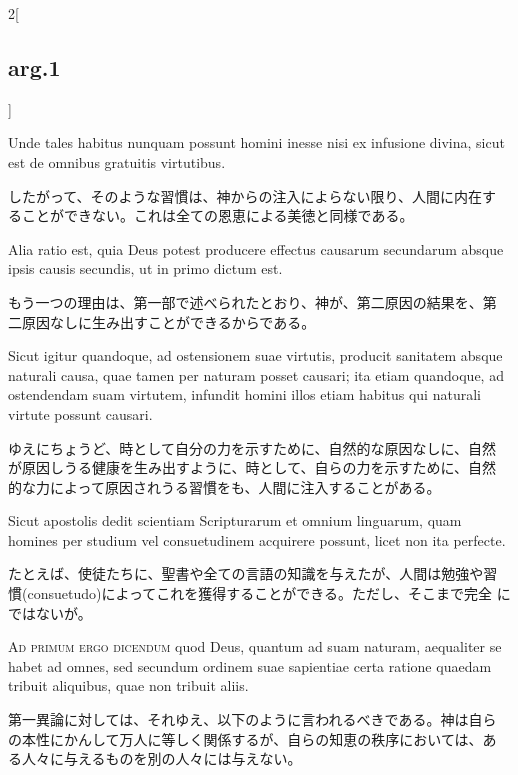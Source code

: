 \documentclass[paper=a4paper,fontsize=10pt,jafontsize=9pt,titlepage]{jlreq}
\begin{document}
\begin{paracol}{2}[\subsection{arg.1}]
\switchcolumn*

Unde tales habitus nunquam possunt homini inesse nisi ex infusione
divina, sicut est de omnibus gratuitis virtutibus.

\switchcolumn

したがって、そのような習慣は、神からの注入によらない限り、人間に内在す
ることができない。これは全ての恩恵による美徳と同様である。

\switchcolumn*

Alia ratio est, quia Deus potest producere effectus causarum
secundarum absque ipsis causis secundis, ut in primo dictum est.

\switchcolumn

もう一つの理由は、第一部で述べられたとおり、神が、第二原因の結果を、第
二原因なしに生み出すことができるからである。

\switchcolumn*

Sicut igitur quandoque, ad ostensionem suae virtutis, producit
sanitatem absque naturali causa, quae tamen per naturam posset
causari; ita etiam quandoque, ad ostendendam suam virtutem, infundit
homini illos etiam habitus qui naturali virtute possunt causari.

\switchcolumn

ゆえにちょうど、時として自分の力を示すために、自然的な原因なしに、自然
が原因しうる健康を生み出すように、時として、自らの力を示すために、自然
的な力によって原因されうる習慣をも、人間に注入することがある。

\switchcolumn*

Sicut apostolis dedit scientiam Scripturarum et omnium linguarum, quam
homines per studium vel consuetudinem acquirere possunt, licet non ita
perfecte.

\switchcolumn

たとえば、使徒たちに、聖書や全ての言語の知識を与えたが、人間は勉強や習
慣(consuetudo)によってこれを獲得することができる。ただし、そこまで完全
にではないが。

\switchcolumn*[\subsection{ad.1}]

{\scshape Ad primum ergo dicendum} quod Deus, quantum ad suam naturam,
aequaliter se habet ad omnes, sed secundum ordinem suae sapientiae
certa ratione quaedam tribuit aliquibus, quae non tribuit aliis.

\switchcolumn

第一異論に対しては、それゆえ、以下のように言われるべきである。神は自ら
の本性にかんして万人に等しく関係するが、自らの知恵の秩序においては、あ
る人々に与えるものを別の人々には与えない。


\end{paracol}
\end{document}
